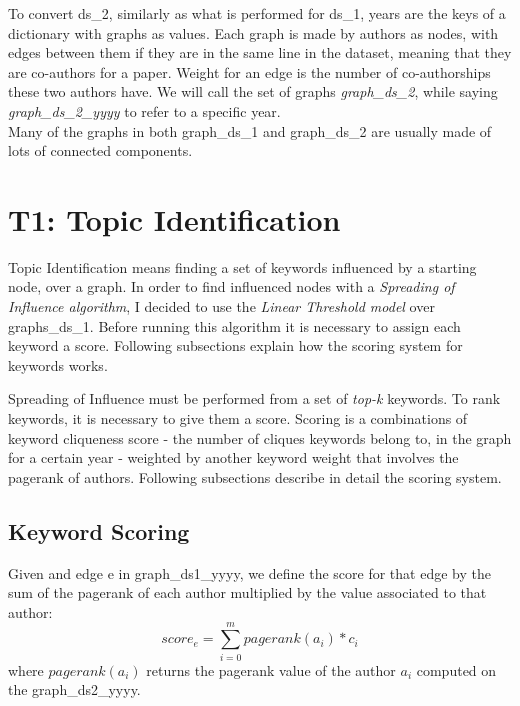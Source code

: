 \documentclass{article}
\begin{document}
To convert ds\_2, similarly as what is performed for ds\_1, years are the keys of a dictionary with graphs as values.
Each graph is made by authors as nodes, with edges between them if they are in the same line in the dataset, meaning that they are co-authors for a paper. Weight for an edge is the number of co-authorships these two authors have.
We will call the set of graphs \textit{graph\_ds\_2}, while saying \textit{graph\_ds\_2\_yyyy} to refer to a specific year.\\
Many of the graphs in both graph\_ds\_1 and graph\_ds\_2 are usually made of lots of connected components.

\section{T1: Topic Identification}
Topic Identification means finding a set of keywords influenced by a starting node, over a graph. In order to find influenced nodes with a \textit{Spreading of Influence algorithm}, I decided to use the \textit{Linear Threshold model} over graphs\_ds\_1.
Before running this algorithm it is necessary to assign each keyword a score.
Following subsections explain how the scoring system for keywords works.

Spreading of Influence must be performed from a set of \textit{top-k} keywords. To rank keywords, it is necessary to give them a score. Scoring is a combinations of keyword cliqueness score - the number of cliques keywords belong to, in the graph for a certain year - weighted by another keyword weight that involves the pagerank of authors.
Following subsections describe in detail the scoring system.

\subsection{Keyword Scoring}
Given and edge e in graph\_ds1\_yyyy, we define the score for that edge  by the sum of the pagerank of each author multiplied by the value associated to that author:
\begin{equation}
	score_e = \sum_{i=0}^m pagerank(a_i)*c_i
\end{equation}
where $pagerank(a_i)$ returns the pagerank value of the author $a_i$ computed on the graph\_ds2\_yyyy.\\
\end{document}
